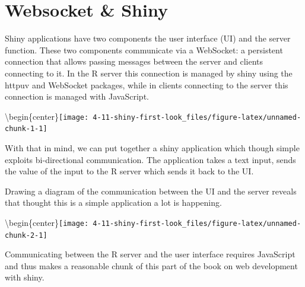 \documentclass[
]{krantz}
\makeatletter
\newenvironment{Shaded}{\begin{snugshade}}{\end{snugshade}}
\newcommand{\ControlFlowTok}[1]{\textcolor[rgb]{0.27,0.27,0.27}{\textbf{#1}}}
\newcommand{\KeywordTok}[1]{\textcolor[rgb]{0.27,0.27,0.27}{\textbf{#1}}}
\newcommand{\NormalTok}[1]{#1}
\newcommand{\OperatorTok}[1]{\textcolor[rgb]{0.43,0.43,0.43}{\textbf{#1}}}
\newcommand{\StringTok}[1]{\textcolor[rgb]{0.5,0.5,0.5}{#1}}
\newenvironment{kframe}{%
\medskip{}
\setlength{\fboxsep}{.8em}
 \def\at@end@of@kframe{}%
 \ifinner\ifhmode%
  \def\at@end@of@kframe{\end{minipage}}%
  \begin{minipage}{\columnwidth}%
 \fi\fi%
 \def\FrameCommand##1{\hskip\@totalleftmargin \hskip-\fboxsep
 \colorbox{shadecolor}{##1}\hskip-\fboxsep
     \hskip-\linewidth \hskip-\@totalleftmargin \hskip\columnwidth}%
 \MakeFramed {\advance\hsize-\width
   \@totalleftmargin\z@ \linewidth\hsize
   \@setminipage}}%
 {\par\unskip\endMakeFramed%
 \at@end@of@kframe}
\renewenvironment{Shaded}{\begin{kframe}}{\end{kframe}}
\makeatother
\begin{document}
\hypertarget{shiny-intro-websocket}{%
\section{Websocket \& Shiny}\label{shiny-intro-websocket}}

Shiny applications have two components the user interface (UI) and the server function. These two components communicate via a WebSocket: a persistent connection that allows passing messages between the server and clients connecting to it. In the R server this connection is managed by shiny using the httpuv \citep{R-httpuv} and WebSocket \citep{R-websocket} packages, while in clients connecting to the server this connection is managed with JavaScript.

\textbackslash begin\{center\}\texttt{[image: 4-11-shiny-first-look\_files/figure-latex/unnamed-chunk-1-1]}

With that in mind, we can put together a shiny application which though simple exploits bi-directional communication. The application takes a text input, sends the value of the input to the R server which sends it back to the UI.

\begin{Shaded}
\end{Shaded}

Drawing a diagram of the communication between the UI and the server reveals that thought this is a simple application a lot is happening.

\textbackslash begin\{center\}\texttt{[image: 4-11-shiny-first-look\_files/figure-latex/unnamed-chunk-2-1]}

Communicating between the R server and the user interface requires JavaScript and thus makes a reasonable chunk of this part of the book on web development with shiny.
\end{document}
